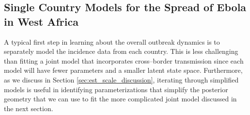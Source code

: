 \subsection{Single Country Models for the Spread of Ebola in West Africa}
\label{subsec:ebola_single_country}

A typical first step in learning about the overall outbreak dynamics is to separately model the incidence data from each country. This is less challenging than fitting a joint model that incorporates cross--border transmission since each model will have fewer parameters and a smaller latent state space. Furthermore, as we discuss in Section \ref{sec:est_scale_discussion}, iterating through simplified models is useful in identifying parameterizations that simplify the posterior geometry that we can use to fit the more complicated joint model discussed in the next section. 

